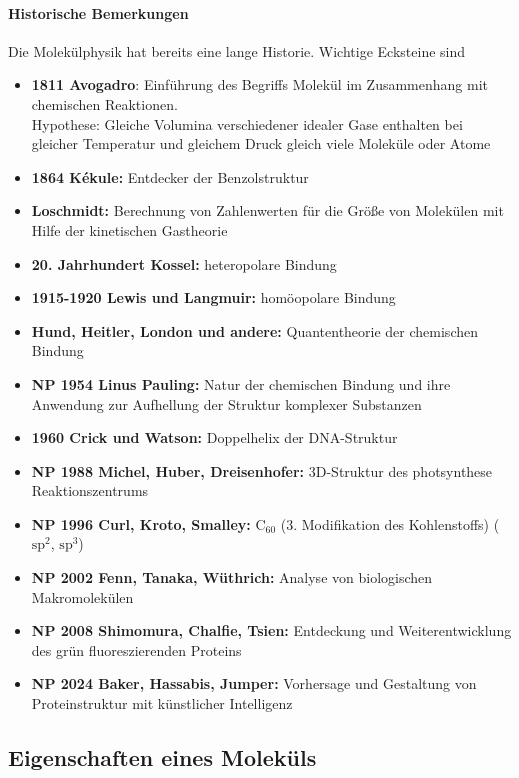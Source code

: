     \paragraph{Historische Bemerkungen} Die Molekülphysik hat bereits eine lange Historie. Wichtige Ecksteine sind
    \begin{itemize}
    	\item \textbf{1811 Avogadro}: Einführung des Begriffs Molekül im Zusammenhang mit chemischen Reaktionen.\\
    		Hypothese: Gleiche Volumina verschiedener idealer Gase enthalten bei gleicher Temperatur und gleichem Druck gleich viele Moleküle oder Atome
    	\item \textbf{1864 Kékule:} Entdecker der Benzolstruktur
    	\item \textbf{Loschmidt:} Berechnung von Zahlenwerten für die Größe von Molekülen mit Hilfe der kinetischen Gastheorie
    	\item \textbf{20. Jahrhundert Kossel:} heteropolare Bindung
    	\item \textbf{1915-1920 Lewis und Langmuir:} homöopolare Bindung
    	\item \textbf{Hund, Heitler, London und andere:} Quantentheorie der chemischen Bindung
    	\item \textbf{NP 1954 Linus Pauling:} Natur der chemischen Bindung und ihre Anwendung zur Aufhellung der Struktur komplexer Substanzen 
    	\item \textbf{1960 Crick und Watson:} Doppelhelix der DNA-Struktur
    	\item \textbf{NP 1988 Michel, Huber, Dreisenhofer:} 3D-Struktur des photsynthese Reaktionszentrums
    	\item \textbf{NP 1996 Curl, Kroto, Smalley:} $\text{C}_{60}$ (3. Modifikation des Kohlenstoffs) ($\text{sp}^{2}$, $\text{sp}^{3}$)
    	\item \textbf{NP 2002 Fenn, Tanaka, Wüthrich:} Analyse von biologischen Makromolekülen
    	\item \textbf{NP 2008 Shimomura, Chalfie, Tsien:} Entdeckung und Weiterentwicklung des grün fluoreszierenden Proteins
        \item \textbf{NP 2024 Baker, Hassabis, Jumper: } Vorhersage und Gestaltung von Proteinstruktur mit künstlicher Intelligenz
    \end{itemize}

\subsection{Eigenschaften eines Moleküls}
